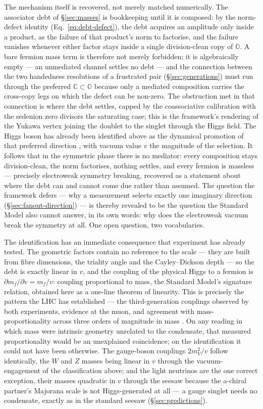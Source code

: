 The mechanism itself is recovered, not merely matched numerically. 
The associator debt of \S\ref{sec:masses} is bookkeeping until it is composed: by the norm-defect
identity (Eq.~\eqref{eq:debt-defect}), the debt acquires an amplitude only inside a product, as the
failure of that product's norm to factorise, and the failure vanishes whenever either factor stays
inside a single division-clean copy of $\mathbb{O}$. A bare fermion mass term is therefore not
merely forbidden; it is algebraically empty --- an unmediated channel settles no debt --- and the
connection between the two handedness resolutions of a frustrated pair (\S\ref{sec:generations})
must run through the preferred $\mathbb{C} \subset \mathbb{O}$ because only a mediated composition
carries the cross-copy legs on which the defect can be non-zero. The obstruction met in that
connection is where the debt settles, capped by the coassociative calibration with the sedenion
zero divisors the saturating case; this is the framework's rendering of the Yukawa vertex joining
the doublet to the singlet through the Higgs field. The Higgs boson has already been identified
above as the dynamical promotion of that preferred direction \autocite{szangolies2025standardmodel},
with vacuum value $v$ the magnitude of the selection. It follows that in the symmetric phase there
is no mediator: every composition stays division-clean, the norm factorises, nothing settles, and
every fermion is massless --- precisely electroweak symmetry breaking, recovered as a statement
about where the debt can and cannot come due rather than assumed. The question the framework defers --- why a
measurement selects exactly one imaginary direction (\S\ref{sec:fanout-direction}) --- is thereby
revealed to be the question the Standard Model also cannot answer, in its own words: why does the
electroweak vacuum break the symmetry at all. One open question, two vocabularies.

The identification has an immediate consequence that experiment has already tested. The geometric
factors contain no reference to the scale --- they are built from fibre dimensions, the triality
angle and the Cayley--Dickson depth --- so the debt is exactly linear in $v$, and the coupling of the
physical Higgs to a fermion is $\partial m_f/\partial v = m_f/v$: coupling proportional to mass, the
Standard Model's signature relation, obtained here as a one-line theorem of linearity. This is
precisely the pattern the LHC has established --- the third-generation couplings observed by both
experiments, evidence at the muon, and agreement with mass-proportionality across three orders of
magnitude in mass \autocite{atlas2022higgs,cms2022higgs}. On any reading in which mass were intrinsic
geometry unrelated to the condensate, that measured proportionality would be an unexplained
coincidence; on the identification it could not have been otherwise. The gauge-boson couplings
$2m_V^2/v$ follow identically, the $W$ and $Z$ masses being linear in $v$ through the
vacuum-engagement of the classification above; and the light neutrinos are the one correct exception,
their masses quadratic in $v$ through the seesaw because the a-chiral partner's Majorana scale is not
Higgs-generated at all --- a gauge singlet needs no condensate, exactly as in the standard seesaw
(\S\ref{sec:predictions}).

